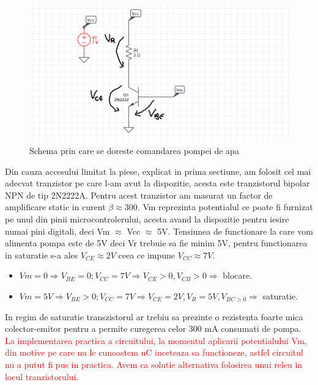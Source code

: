 \documentclass[12pt]{article}
\begin{document}
\newpage

\begin{figure}[H]
\centering
\includegraphics[width=\textwidth]{Pictures/tranz.png}
\caption{Schema prin care se doreste comandarea pompei de apa}
\end{figure}

Din cauza accesului limitat la piese, explicat in prima sectiune, am folosit cel mai adecvat tranzistor pe care l-am avut la dispozitie, acesta este tranzistorul bipolar NPN de tip 2N2222A. Pentru acest tranzistor am masurat un factor de amplificare static in curent $\beta \approx 300$. Vm reprezinta potentialul ce poate fi furnizat pe unul din pinii microcontrolerului, acesta avand la dispozitie pentru iesire numai pini digitali, deci Vm $\approx$ Vcc $\approx$ 5V. Tensiunea de functionare la care vom alimenta pompa este de 5V deci Vr trebuie sa fie minim 5V, pentru functionarea in saturatie s-a ales $V_{CE} \approx 2V$ ceea ce impune $V_{CC} \approx 7V$. \\
\begin{itemize}

\item $Vm = 0 \Rightarrow V_{BE} = 0; V_{CC} = 7V \Rightarrow V_{CE} > 0, V_{CB} > 0 \Rightarrow$ blocare. 

\item $Vm = 5V \Rightarrow V_{BE} > 0; V_{CC} = 7V \Rightarrow V_{CE} = 2V, V_{R} = 5V, V_{BC > 0} \Rightarrow$ saturatie.

\end{itemize}
In regim de saturatie transzistorul ar trebiu sa prezinte o rezistenta foarte mica colector-emitor pentru a permite curegerea celor 300 mA consumati de pompa. \newpage\textcolor{red}{ La implementarea practica a circuitului, la momentul aplicarii potentialului Vm, din motive pe care nu le cunoastem uC inceteaza sa functioneze, astfel circuitul nu a putut fi pus in practica. Avem ca solutie alternativa folosirea unui releu in locul tranzistorului}.
\end{document}
